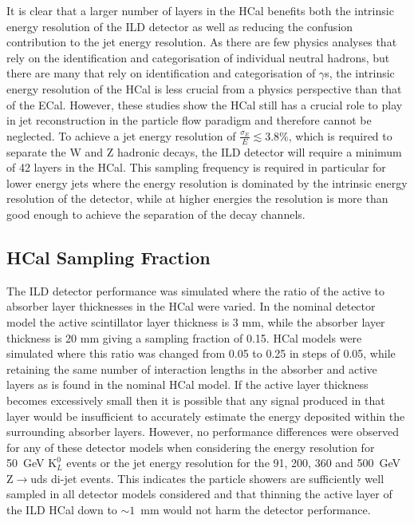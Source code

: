 It is clear that a larger number of layers in the HCal benefits both the intrinsic energy resolution of the ILD detector as well as reducing the confusion contribution to the jet energy resolution.  As there are few physics analyses that rely on the identification and categorisation of individual neutral hadrons, but there are many that rely on identification and categorisation of $\gamma$s, the intrinsic energy resolution of the HCal is less crucial from a physics perspective than that of the ECal.  However, these studies show the HCal still has a crucial role to play in jet reconstruction in the particle flow paradigm and therefore cannot be neglected.  To achieve a jet energy resolution of $\frac{\sigma_{E}}{E} \lesssim 3.8\%$, which is required to separate the W and Z hadronic decays, the ILD detector will require a minimum of 42 layers in the HCal.  This sampling frequency is required in particular for lower energy jets where the energy resolution is dominated by the intrinsic energy resolution of the detector, while at higher energies the resolution is more than good enough to achieve the separation of the decay channels.  


\subsection{HCal Sampling Fraction}
\label{sec:hcalsamplingfraction}
The ILD detector performance was simulated where the ratio of the active to absorber layer thicknesses in the HCal were varied.  In the nominal detector model the active scintillator layer thickness is 3 mm, while the absorber layer thickness is 20 mm giving a sampling fraction of 0.15.  HCal models were simulated where this ratio was changed from 0.05 to 0.25 in steps of 0.05, while retaining the same number of interaction lengths in the absorber and active layers as is found in the nominal HCal model.  If the active layer thickness becomes excessively small then it is possible that any signal produced in that layer would be insufficient to accurately estimate the energy deposited within the surrounding absorber layers.  However, no performance differences were observed for any of these detector models when considering the energy resolution for 50~GeV $\text{K}^{0}_{L}$ events or the jet energy resolution for the 91, 200, 360 and 500~GeV Z$\rightarrow$uds di-jet events.  This indicates the particle showers are sufficiently well sampled in all detector models considered and that thinning the active layer of the ILD HCal down to $\sim1$~mm would not harm the detector performance.  

